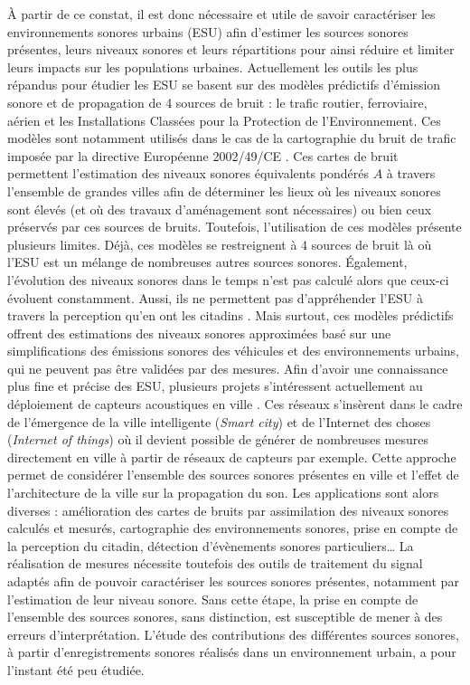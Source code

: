 À partir de ce constat, il est donc nécessaire et utile de savoir caractériser les environnements sonores urbains (ESU) afin d'estimer les sources sonores présentes, leurs niveaux sonores et leurs répartitions pour ainsi réduire et limiter leurs impacts sur les populations urbaines.
Actuellement les outils les plus répandus pour étudier les ESU se basent sur des modèles prédictifs d'émission sonore et de propagation de 4 sources de bruit : le trafic routier, ferroviaire, aérien et les Installations Classées pour la Protection de l'Environnement. Ces modèles sont notamment utilisés dans le cas de la cartographie du bruit de trafic imposée par la directive Européenne 2002/49/CE \cite{directive}. Ces cartes de bruit permettent l'estimation des niveaux sonores équivalents pondérés $A$ à travers l'ensemble de grandes villes afin de déterminer les lieux où les niveaux sonores sont élevés (et où des travaux d'aménagement sont nécessaires) ou bien ceux préservés par ces sources de bruits. 
Toutefois, l'utilisation de ces modèles présente plusieurs limites. Déjà, ces modèles se restreignent à 4 sources de bruit là où l'ESU est un mélange de nombreuses autres sources sonores. \'Egalement, l'évolution des niveaux sonores dans le temps n'est pas calculé alors que ceux-ci évoluent constamment. Aussi, ils ne permettent pas d'appréhender l'ESU à travers la perception qu'en ont les citadins \cite{aumond2017modeling}.
Mais surtout, ces modèles prédictifs offrent des estimations des niveaux sonores approximées basé sur une simplifications des émissions sonores des véhicules et des environnements urbains, qui ne peuvent pas être validées par des mesures. 
Afin d'avoir une connaissance plus fine et précise des ESU, plusieurs projets s'intéressent actuellement au déploiement de capteurs acoustiques en ville \cite{picaut2017characterization,zambon2017life}. Ces réseaux s'insèrent dans le cadre de l'émergence de la ville intelligente (\textit{Smart city}) et de l'Internet des choses (\textit{Internet of things}) où il devient possible de générer de nombreuses mesures directement en ville à partir de réseaux de capteurs par exemple. Cette approche permet de considérer l'ensemble des sources sonores présentes en ville et l'effet de l'architecture de la ville sur la propagation du son. Les applications sont alors diverses : amélioration des cartes de bruits par assimilation des niveaux sonores calculés et mesurés, cartographie des environnements sonores, prise en compte de la perception du citadin, détection d'évènements sonores particuliers\dots{}
La réalisation de mesures nécessite toutefois des outils de traitement du signal adaptés afin de pouvoir caractériser les sources sonores présentes, notamment par l'estimation de leur niveau sonore. Sans cette étape, la prise en compte de l'ensemble des sources sonores, sans distinction, est susceptible de mener à des erreurs d'interprétation. L'étude des contributions des différentes sources sonores, à partir d'enregistrements sonores réalisés dans un environnement urbain, a pour l'instant été peu étudiée.
